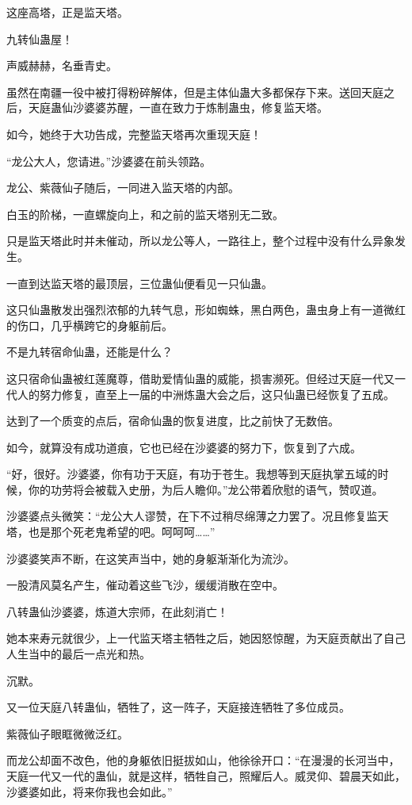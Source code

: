 \begin{this_body}
这座高塔，正是监天塔。

九转仙蛊屋！

声威赫赫，名垂青史。

虽然在南疆一役中被打得粉碎解体，但是主体仙蛊大多都保存下来。送回天庭之后，天庭蛊仙沙婆婆苏醒，一直在致力于炼制蛊虫，修复监天塔。

如今，她终于大功告成，完整监天塔再次重现天庭！

“龙公大人，您请进。”沙婆婆在前头领路。

龙公、紫薇仙子随后，一同进入监天塔的内部。

白玉的阶梯，一直螺旋向上，和之前的监天塔别无二致。

只是监天塔此时并未催动，所以龙公等人，一路往上，整个过程中没有什么异象发生。

一直到达监天塔的最顶层，三位蛊仙便看见一只仙蛊。

这只仙蛊散发出强烈浓郁的九转气息，形如蜘蛛，黑白两色，蛊虫身上有一道微红的伤口，几乎横跨它的身躯前后。

不是九转宿命仙蛊，还能是什么？

这只宿命仙蛊被红莲魔尊，借助爱情仙蛊的威能，损害濒死。但经过天庭一代又一代人的努力修复，直至上一届的中洲炼蛊大会之后，这只仙蛊已经恢复了五成。

达到了一个质变的点后，宿命仙蛊的恢复进度，比之前快了无数倍。

如今，就算没有成功道痕，它也已经在沙婆婆的努力下，恢复到了六成。

“好，很好。沙婆婆，你有功于天庭，有功于苍生。我想等到天庭执掌五域的时候，你的功劳将会被载入史册，为后人瞻仰。”龙公带着欣慰的语气，赞叹道。

沙婆婆点头微笑：“龙公大人谬赞，在下不过稍尽绵薄之力罢了。况且修复监天塔，也是那个死老鬼希望的吧。呵呵呵……”

沙婆婆笑声不断，在这笑声当中，她的身躯渐渐化为流沙。

一股清风莫名产生，催动着这些飞沙，缓缓消散在空中。

八转蛊仙沙婆婆，炼道大宗师，在此刻消亡！

她本来寿元就很少，上一代监天塔主牺牲之后，她因怒惊醒，为天庭贡献出了自己人生当中的最后一点光和热。

沉默。

又一位天庭八转蛊仙，牺牲了，这一阵子，天庭接连牺牲了多位成员。

紫薇仙子眼眶微微泛红。

而龙公却面不改色，他的身躯依旧挺拔如山，他徐徐开口：“在漫漫的长河当中，天庭一代又一代的蛊仙，就是这样，牺牲自己，照耀后人。威灵仰、碧晨天如此，沙婆婆如此，将来你我也会如此。”


\end{this_body}
